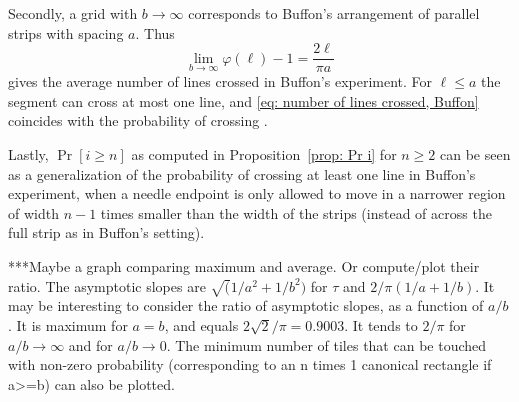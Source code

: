 \documentclass[12pt, a4paper]{article}
\newcommand{\funt}{\tau} %
\newcommand{\funta}{\varphi} %
\newcommand{\len}{\ell} %
\begin{document}
Secondly, a grid with $b \rightarrow \infty$ corresponds to Buffon's arrangement of parallel strips with spacing $a$. Thus
\begin{equation}
\label{eq: number of lines crossed, Buffon}
\lim_{b \rightarrow \infty} \funta(\len)-1 = \frac{2\len}{\pi a}
\end{equation}
gives the average number of lines crossed in Buffon's experiment. For $\len \leq a$ the segment can cross at most one line, and \eqref{eq: number of lines crossed, Buffon} coincides with the probability of crossing \cite[section 1.1]{Mathai99}.

Lastly, $\Pr[i \geq n]$ as computed in Proposition~\ref{prop: Pr i} for $n \geq 2$ can be seen as a generalization of the probability of crossing at least one line in Buffon's experiment, when a needle endpoint is only allowed to move in a narrower region of width $n-1$ times smaller than the width of the strips (instead of across the full strip as in Buffon's setting).

***Maybe a graph comparing maximum and average. Or compute/plot their ratio. The asymptotic slopes are $\sqrt(1/a^2+1/b^2)$ for $\funt$ and $2/\pi(1/a+1/b)$. It may be interesting to consider the ratio of asymptotic slopes, as a function of $a/b$. It is maximum for $a=b$, and equals $2\sqrt 2/\pi = 0.9003$. It tends to $2/\pi$ for $a/b \rightarrow \infty$ and for $a/b \rightarrow 0$. The minimum number of tiles that can be touched with non-zero probability (corresponding to an n times 1 canonical rectangle if a>=b) can also be plotted.




\end{document}
